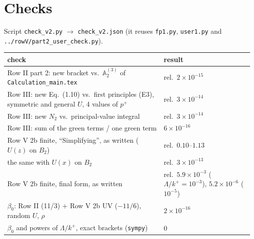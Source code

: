 \documentclass[10pt]{article}
\numberwithin{equation}{section}
\def\mf#1{\mathbb{#1}}
\begin{document}
\section{Checks}
Script \texttt{check\_v2.py} $\to$ \texttt{check\_v2.json} (it reuses \texttt{fp1.py}, \texttt{user1.py} and \texttt{../rowV/part2\_user\_check.py}).
\begin{center}\small
\begin{tabular}{@{}p{}p{}@{}}\toprule
check & result\\\midrule
Row II part 2: new bracket vs.\ $\mf A^{(3)}_2$ of \texttt{Calculation\_main.tex} & rel.\ $2\times10^{-15}$\\
Row III: new Eq.~(1.10) vs.\ first principles (E3), symmetric and general $U$, 4 values of $p^+$ & rel.\ $3\times10^{-14}$\\
Row III: new $N_2$ vs.\ principal-value integral & rel.\ $3\times10^{-14}$\\
Row III: sum of the green terms / one green term & $6\times10^{-16}$\\
Row V 2b finite, ``Simplifying'', as written ($U(z)$ on $B_2$) & rel.\ $0.10$--$1.13$\\
\quad the same with $U(x)$ on $B_2$ & rel.\ $3\times10^{-13}$\\
Row V 2b finite, final form, as written & rel.\ $5.9\times10^{-3}$ ($\Lambda/k^+=10^{-3}$), $5.2\times10^{-6}$ ($10^{-5}$)\\
$\beta_0$: Row II (11/3) $+$ Row V 2b UV ($-11/6$), random $U$, $\rho$ & $2\times10^{-16}$\\
$\beta_0$ and powers of $\Lambda/k^+$, exact brackets (\texttt{sympy}) & $0$\\\bottomrule
\end{tabular}
\end{center}
\end{document}
